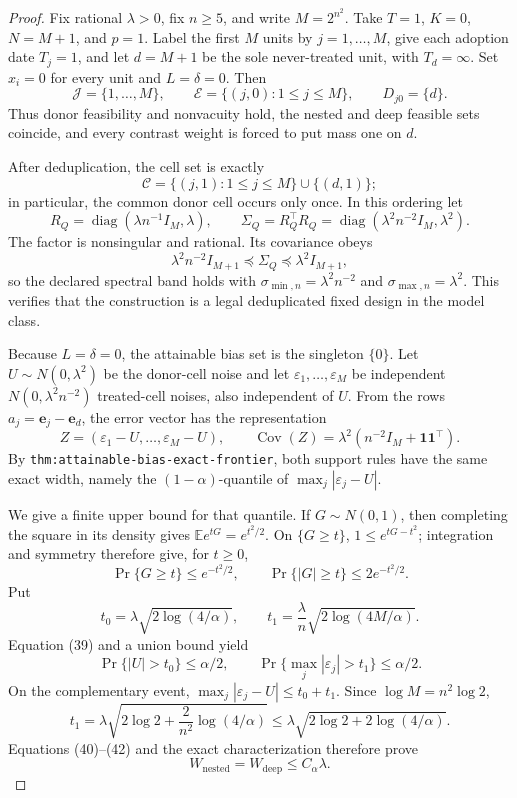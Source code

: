 \documentclass{article}
\begin{document}
\begin{proof}
Fix rational \(\lambda>0\), fix \(n\geq5\), and write \(M=2^{n^2}\).
Take \(T=1\), \(K=0\),
\(N=M+1\), and \(p=1\).  Label the first \(M\) units by
\(j=1,\ldots,M\), give each adoption date \(T_j=1\), and let
\(d=M+1\) be the sole never-treated unit, with \(T_d=\infty\).  Set
\(x_i=0\) for every unit and \(L=\delta=0\).  Then
\[
 \mathcal J=\{1,\ldots,M\},\qquad
 \mathcal E=\{(j,0):1\leq j\leq M\},\qquad
 D_{j0}=\{d\}. \tag{34}
\]
Thus donor feasibility and nonvacuity hold, the nested and deep feasible sets
coincide, and every contrast weight is forced to put mass one on \(d\).

After deduplication, the cell set is exactly
\[
 \mathcal C=\{(j,1):1\leq j\leq M\}\cup\{(d,1)\}; \tag{35}
\]
in particular, the common donor cell occurs only once.  In this ordering let
\[
 R_Q=\operatorname{diag}(\lambda n^{-1}I_M,\lambda),
 \qquad
 \Sigma_Q=R_Q^{\top}R_Q
 =\operatorname{diag}(\lambda^2n^{-2}I_M,\lambda^2). \tag{36}
\]
The factor is nonsingular and rational.  Its covariance obeys
\[
 \lambda^2n^{-2}I_{M+1}\preceq\Sigma_Q
 \preceq\lambda^2I_{M+1}, \tag{37}
\]
so the declared spectral band holds with
\(\sigma_{\min,n}=\lambda^2n^{-2}\) and
\(\sigma_{\max,n}=\lambda^2\).  This verifies that
the construction is a legal deduplicated fixed design in the model class.

Because \(L=\delta=0\), the attainable bias set is the singleton
\(\{0\}\).  Let \(U\sim N(0,\lambda^2)\) be the donor-cell noise and let
\(\varepsilon_1,\ldots,\varepsilon_M\) be independent
\(N(0,\lambda^2n^{-2})\) treated-cell noises, also independent of \(U\).
From the
rows \(a_j=\mathbf e_j-\mathbf e_d\), the error vector has the representation
\[
 Z=(\varepsilon_1-U,\ldots,\varepsilon_M-U),
 \qquad
 \operatorname{Cov}(Z)=\lambda^2
 (n^{-2}I_M+\mathbf1\mathbf1^{\top}). \tag{38}
\]
By \texttt{thm:attainable-bias-exact-frontier}, both support rules have the
same exact width, namely the \((1-\alpha)\)-quantile of
\(\max_j|\varepsilon_j-U|\).

We give a finite upper bound for that quantile.  If \(G\sim N(0,1)\), then
completing the square in its density gives
\(\mathbb E e^{tG}=e^{t^2/2}\).  On \(\{G\geq t\}\),
\(1\leq e^{tG-t^2}\); integration and symmetry therefore give, for
\(t\geq0\),
\[
 \Pr\{G\geq t\}\leq e^{-t^2/2},
 \qquad
 \Pr\{|G|\geq t\}\leq2e^{-t^2/2}. \tag{39}
\]
Put
\[
 t_0=\lambda\sqrt{2\log(4/\alpha)},
 \qquad
 t_1=\frac{\lambda}{n}\sqrt{2\log(4M/\alpha)}. \tag{40}
\]
Equation (39) and a union bound yield
\[
 \Pr\{|U|>t_0\}\leq\alpha/2,
 \qquad
 \Pr\{\max_j|\varepsilon_j|>t_1\}\leq\alpha/2. \tag{41}
\]
On the complementary event,
\(\max_j|\varepsilon_j-U|\leq t_0+t_1\).  Since
\(\log M=n^2\log2\),
\[
 t_1=\lambda\sqrt{2\log2+\frac{2}{n^2}\log(4/\alpha)}
 \leq\lambda\sqrt{2\log2+2\log(4/\alpha)}. \tag{42}
\]
Equations (40)--(42) and the exact characterization therefore prove
\[
 W_{\mathrm{nested}}=W_{\mathrm{deep}}\leq C_\alpha\lambda. \tag{43}
\]


\end{proof}
\end{document}
